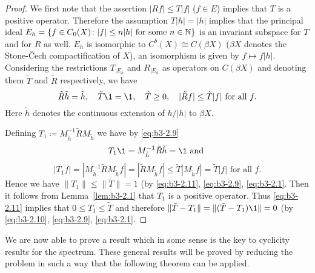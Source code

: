 \begin{proof}
	We first note that the assertion $|Rf| \leq T|f|$ ($f \in E$) implies that $T$ is a positive operator.
	Therefore the assumption $T|h| = |h|$ implies that the principal ideal $E_{h} = \{f \in C_{0}(X) \colon |f| \leq n|h| \text{ for some } n \in \mathbb{N}\}$ is an invariant subspace for $T$ and for $R$ as well.
	$E_{h}$ is isomorphic to $C^{b}(X) \cong C(\beta X)$ ($\beta X$ denotes the Stone-Čech compactification of $X$), an isomorphism is given by $f \mapsto f|h|$.
	Considering the restrictions $T_{|E_{h}}$ and $R_{|E_{h}}$ as operators on $C(\beta X)$ and denoting them $\tilde{T}$ and $\tilde{R}$ respectively, we have
\begin{equation}\label{eq:b3-2.9}
		\tilde{R}\tilde{h} = \tilde{h}, \quad \tilde{T}\1 = \1, \quad \tilde{T} \geq 0, \quad |\tilde{R}f| \leq \tilde{T}|f| \text{ for all } f.
	\end{equation}
	Here $\tilde{h}$ denotes the continuous extension of $h/|h|$ to $\beta X$.
	
	Defining $T_{1} \coloneqq M_{\tilde{h}}^{-1}\tilde{R}M_{\tilde{h}}$ we have by \eqref{eq:b3-2.9}
	\begin{equation}\label{eq:b3-2.10}
	T_{1}\1 = M_{\tilde{h}}^{-1}\tilde{R}\tilde{h} = \1 \text{ and }
	\end{equation}
	\begin{equation}\label{eq:b3-2.11}
	|T_{1}f| = |M_{\tilde{h}}^{-1}\tilde{R}M_{\tilde{h}}f| = |\tilde{R}M_{\tilde{h}}f| \leq \tilde{T}|M_{\tilde{h}}f| = \tilde{T}|f| \text{ for all } f.
	\end{equation}
	Hence we have $\|T_{1}\| \leq \|\tilde{T}\| = 1$ (by \eqref{eq:b3-2.11}, \eqref{eq:b3-2.9}, \eqref{eq:b3-2.1}.
	Then it follows from Lemma~\ref{lem:b3-2.1} that $T_{1}$ is a positive operator.
	Thus \eqref{eq:b3-2.11} implies that $0 \leq T_{1} \leq \tilde{T}$ and therefore $\|\tilde{T} - T_{1}\| = \|(\tilde{T} - T_{1})\1\| = 0$ (by \eqref{eq:b3-2.10}, \eqref{eq:b3-2.9}, \eqref{eq:b3-2.1}.
\end{proof}
We are now able to prove a result which in some sense is the key to cyclicity results for the spectrum.
	These general results will be proved by reducing the problem in such a way that the following theorem can be applied.
